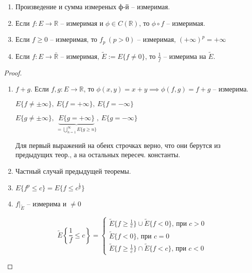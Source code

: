 \begin{theorem}
    \begin{enumerate}
        \item Произведение и сумма измереных ф-й -- измеримая.
        \item Если  $f: E \rightarrow \mathbb{R}$ -- измеримая и $\phi \in C(\mathbb{R})$, то $\phi \circ f$ -- измеримая.
        \item Если $f \geq 0$ -- измеримая, то $f_p \ (p>0)$ -- измеримая, $(+\infty)^p = +\infty$
        \item Если $f: E \rightarrow \bar{\mathbb{R}}$ -- измеримая, $\tilde{E} := E \{f \not = 0\}$, то $\frac{1}{f}$ -- измерима на $\tilde{E}$.
    \end{enumerate}
\end{theorem}
\begin{proof}
    \begin{enumerate}
        \item {
            $f + g.$ Если $f, g: E \rightarrow \mathbb{R}$, то $\phi(x, y) = x+y \implies \phi(f, g) = f+g$ -- измерима.

            $E \{ f \not = \pm \infty \}, \ E \{ f = + \infty \}, \ E \{ f = -\infty \}$

            $E \{ g \not = \pm \infty \}, \ \underbrace{E \{ g = + \infty \}}_{= \bigcup_{n=1}^{\infty} E \{ g \geq n \}}, \ E \{ g = -\infty \}$


            Для первый выражений на обеих строчках верно, что они берутся из предыдущих теор., а на остальных пересеч. константы.
        }
        \item {
            Частный случай предыдущей теоремы.
        }
        \item {
            $E \{f^p \leq c\} = E \{ f \leq c^{\frac{1}{p}} \}$
        }
        \item {
            $f|_{\tilde{E}}$ -- измерима и $\not = 0$
            

            \begin{equation}
                \tilde{E}\left\{ \frac{1}{f} \leq c \right\} = 
                \begin{cases}
                    \tilde{E} \{ f \geq \frac{1}{c} \} \cup \tilde{E} \{ f < 0 \} \text{, при $c > 0$} \\
                    \tilde{E}\{ f < 0 \} \text{, при $c = 0$} \\
                    \tilde{E} \{ f \geq \frac{1}{c} \} \cap \tilde{E} \{ f < c \} \text{, при $c < 0$}
                \end{cases}                
            \end{equation}
        }
    \end{enumerate}
\end{proof}
